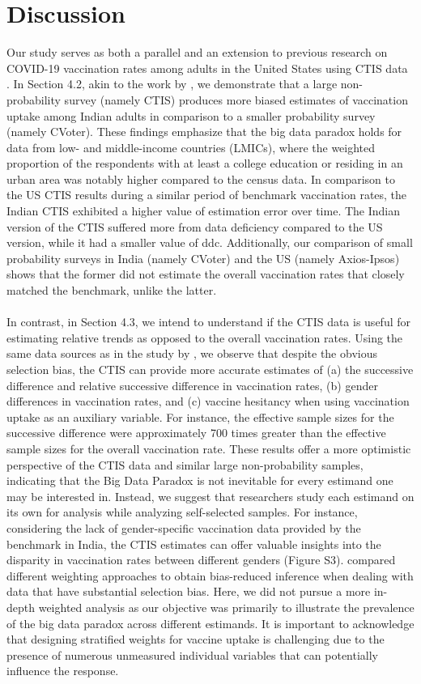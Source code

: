 \documentclass{article}
\begin{document}
\section{Discussion}

Our study serves as both a parallel and an extension to previous research on COVID-19 vaccination rates among adults in the United States using CTIS data \citep{Bradley2021-io}. In Section 4.2, akin to the work by \cite{Bradley2021-io}, we demonstrate that a large non-probability survey (namely CTIS) produces more biased estimates of vaccination uptake among Indian adults in comparison to a smaller probability survey (namely CVoter). These findings emphasize that the big data paradox holds for data from low- and middle-income countries (LMICs), where the weighted proportion of the respondents with at least a college education or residing in an urban area was notably higher compared to the census data. In comparison to the US CTIS results during a similar period of benchmark vaccination rates, the Indian CTIS exhibited a higher value of estimation error over time. The Indian version of the CTIS suffered more from data deficiency compared to the US version, while it had a smaller value of ddc. Additionally, our comparison of small probability surveys in India (namely CVoter) and the US (namely Axios-Ipsos) shows that the former did not estimate the overall vaccination rates that closely matched the benchmark, unlike the latter.
\\
\\
In contrast, in Section 4.3, we intend to understand if the CTIS data is useful for estimating relative trends as opposed to the overall vaccination rates. Using the same data sources as in the study by \cite{Bradley2021-io}, we observe that despite the obvious selection bias, the CTIS can provide more accurate estimates of (a) the successive difference and relative successive difference in vaccination rates, (b) gender differences in vaccination rates, and (c) vaccine hesitancy when using vaccination uptake as an auxiliary variable. For instance, the effective sample sizes for the successive difference were approximately 700 times greater than the effective sample sizes for the overall vaccination rate. These results offer a more optimistic perspective of the CTIS data and similar large non-probability samples, indicating that the Big Data Paradox is not inevitable for every estimand one may be interested in. Instead, we suggest that researchers study each estimand on its own for analysis while analyzing self-selected samples. For instance, considering the lack of gender-specific vaccination data provided by the benchmark in India, the CTIS estimates can offer valuable insights into the disparity in vaccination rates between different genders (Figure S3). \cite{kundu2023framework} compared different weighting approaches to obtain bias-reduced inference when dealing with data that have substantial selection bias. Here, we did not pursue a more in-depth weighted analysis as our objective was primarily to illustrate the prevalence of the big data paradox across different estimands. It is important to acknowledge that designing stratified weights for vaccine uptake is challenging due to the presence of numerous unmeasured individual variables that can potentially influence the response.
\end{document}
